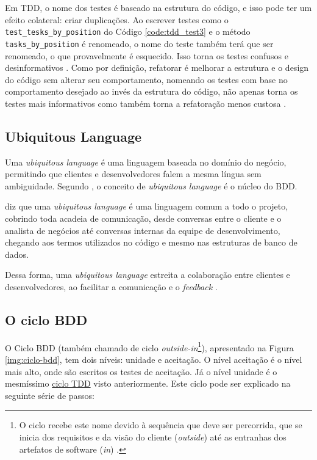 Em TDD, o nome dos testes é baseado na estrutura do código, e isso pode ter um efeito colateral: criar duplicações. Ao escrever testes como o \texttt{test\_tesks\_by\_position} do Código \ref{code:tdd_test3} e o método \texttt{tasks\_by\_position} é renomeado, o nome do teste também terá que ser renomeado, o que provavelmente é esquecido. Isso torna os testes confusos e desinformativos \cite{ContinuousTesting}. Como por definição, refatorar é melhorar a estrutura e o design do código sem alterar seu comportamento, nomeando os testes com base no comportamento desejado ao invés da estrutura do código, não apenas torna os testes mais informativos como também torna a refatoração menos custosa \cite{ContinuousTesting}.


\subsection{Ubiquitous Language} %
\label{sub:ubiquitous_language}

Uma \textit{ubiquitous language} é uma linguagem baseada no domínio do negócio, permitindo que clientes e desenvolvedores falem a mesma língua sem ambiguidade. Segundo , o conceito de \textit{ubiquitous language} é o núcleo do BDD.


 diz que uma \textit{ubiquitous language} é uma linguagem comum a todo o projeto, cobrindo toda acadeia de comunicação, desde conversas entre o cliente e o analista de negócios até conversas internas da equipe de desenvolvimento, chegando aos termos utilizados no código e mesmo nas estruturas de banco de dados.

Dessa forma, uma \textit{ubiquitous language} estreita a colaboração entre clientes e desenvolvedores, ao facilitar a comunicação e o \textit{feedback} \cite{DDD}.


\subsection{O ciclo BDD}
\label{sub:o_ciclo_bdd}

O Ciclo BDD (também chamado de ciclo \textit{outside-in}\footnote{O ciclo recebe este nome devido à sequência que deve ser percorrida, que se inicia dos requisitos e da visão do cliente (\textit{outside}) até as entranhas dos artefatos de software (\textit{in}) \cite{BDDRodrigo}.}), apresentado na Figura \ref{img:ciclo-bdd}, tem dois níveis: unidade e aceitação. O nível aceitação é o nível mais alto, onde são escritos os testes de aceitação. Já o nível unidade é o mesmíssimo \hyperref[ssub:ciclo_tdd]{ciclo TDD} visto anteriormente. Este ciclo pode ser explicado na seguinte série de passos:

